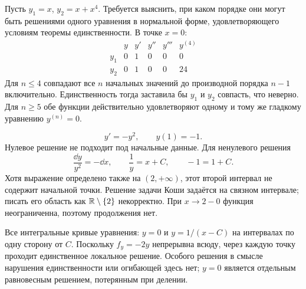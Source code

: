 Пусть $y_1=x$, $y_2=x+x^4$. Требуется выяснить, при каком порядке
они могут быть решениями одного уравнения в нормальной форме,
удовлетворяющего условиям теоремы единственности.
В точке $x=0$:
\[
\begin{array}{c|ccccc}
 &y&y'&y''&y'''&y^{(4)}\\\hline
 y_1&0&1&0&0&0\\
 y_2&0&1&0&0&24
\end{array}
\]
Для $n\le4$ совпадают все $n$ начальных значений до производной
порядка $n-1$ включительно. Единственность тогда заставила бы
$y_1$ и $y_2$ совпасть, что неверно.
Для $n\ge5$ обе функции действительно удовлетворяют одному и тому же
гладкому уравнению $y^{(n)}=0$.

\[
 y'=-y^2,\qquad y(1)=-1.
\]
Нулевое решение не подходит под начальные данные.
Для ненулевого решения
\[
 \frac{\dd y}{y^2}=-\dd x,\qquad \frac1y=x+C,
 \qquad -1=1+C.
\]
Хотя выражение определено также на $(2,+\infty)$, этот второй интервал
не содержит начальной точки. Решение задачи Коши задаётся на связном
интервале; писать его область как $\mathbb{R}\setminus\{2\}$ некорректно.
При $x\to2-0$ функция неограниченна, поэтому продолжения нет.

Все интегральные кривые уравнения: $y=0$ и $y=1/(x-C)$ на интервалах
по одну сторону от $C$. Поскольку $f_y=-2y$ непрерывна всюду,
через каждую точку проходит единственное локальное решение.
Особого решения в смысле нарушения единственности или огибающей здесь нет;
$y=0$ является отдельным равновесным решением, потерянным при делении.

\begin{center}
\end{center}


